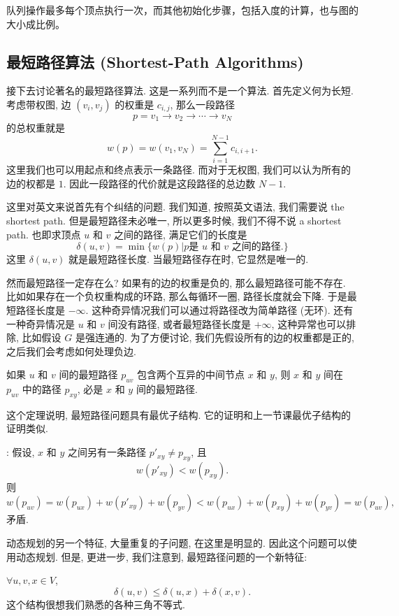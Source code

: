 \documentclass[a4paper]{ctexart}
\theoremstyle{definition}
\theoremstyle{definition}
\begin{document}
队列操作最多每个顶点执行一次，而其他初始化步骤，包括入度的计算，也与图的大小成比例。


\subsection{最短路径算法 (Shortest-Path Algorithms)}
接下去讨论著名的最短路径算法. 这是一系列而不是一个算法.
首先定义何为长短. 考虑带权图, 边 $(v_i, v_j)$ 的权重是 $c_{i, j}$,
那么一段路径
$$
p = v_1 \to v_2 \to \cdots \to v_N
$$
的总权重就是
$$
w(p) = w(v_1, v_N) = \sum_{i = 1}^{N - 1}c_{i, i + 1}.
$$
这里我们也可以用起点和终点表示一条路径. 而对于无权图, 我们可以认为所有的边的权都是 $1$.
因此一段路径的代价就是这段路径的总边数 $N - 1$. 

 这里对英文来说首先有个纠结的问题. 我们知道,
按照英文语法, 我们需要说 the shortest path. 但是最短路径未必唯一, 所以更多时候,
我们不得不说 a shortest path. 也即求顶点 $u$ 和 $v$ 之间的路径, 满足它们的长度是
$$
\delta(u, v) = \min \{w(p) | p \mbox{是 $u$ 和 $v$ 之间的路径.}\}
$$
这里 $\delta(u, v)$ 就是最短路径长度. 当最短路径存在时, 它显然是唯一的.

然而最短路径一定存在么? 如果有的边的权重是负的, 那么最短路径可能不存在.
比如如果存在一个负权重构成的环路, 那么每循环一圈, 路径长度就会下降.
于是最短路径长度是 $-\infty$. 这种奇异情况我们可以通过将路径改为简单路径 (无环).
还有一种奇异情况是 $u$ 和 $v$ 间没有路径, 或者最短路径长度是 $+\infty$,
这种异常也可以排除, 比如假设 $G$ 是强连通的. 为了方便讨论,
我们先假设所有的边的权重都是正的, 之后我们会考虑如何处理负边.

 如果 $u$ 和 $v$ 间的最短路径 $p_{uv}$ 包含两个互异的中间节点
$x$ 和 $y$, 则 $x$ 和 $y$ 间在 $p_{uv}$ 中的路径 $p_{xy}$, 必是 $x$ 和 $y$ 间的最短路径.

这个定理说明, 最短路径问题具有最优子结构. 它的证明和上一节课最优子结构的证明类似.

: 假设, $x$ 和 $y$ 之间另有一条路径 $p'_{xy} \neq p_{xy}$, 且
$$
w(p'_{xy}) < w(p_{xy}).
$$
则
$$
w(p_{uv}) = w(p_{ux}) + w(p'_{xy}) + w(p_{yv}) < w(p_{ux}) + w(p_{xy}) + w(p_{yv})
= w(p_{uv}),
$$
矛盾. 

动态规划的另一个特征, 大量重复的子问题, 在这里是明显的. 因此这个问题可以使用动态规划.
但是, 更进一步, 我们注意到, 最短路径问题的一个新特征:

 $\forall u, v, x \in V$,
$$
\delta(u, v) \leq \delta(u, x) + \delta(x, v).
$$
这个结构很想我们熟悉的各种三角不等式.
\end{document}
